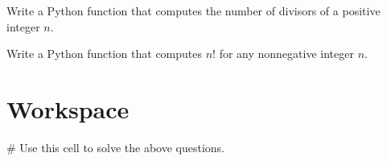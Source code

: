 \documentclass{ximera}
\begin{document}
\begin{question}
	Write a Python function that computes the number of divisors of a positive integer $n$.
\begin{hint}
\begin{sageCell}

\end{sageCell}
\end{hint}
\end{question}

\begin{question}
	Write a Python function that computes $n!$ for any nonnegative integer $n$.
\begin{hint}
\begin{sageCell}

\end{sageCell}
\end{hint}
\end{question}

\section{Workspace}

\begin{sageCell}
# Use this cell to solve the above questions.
\end{sageCell}
\end{document}
